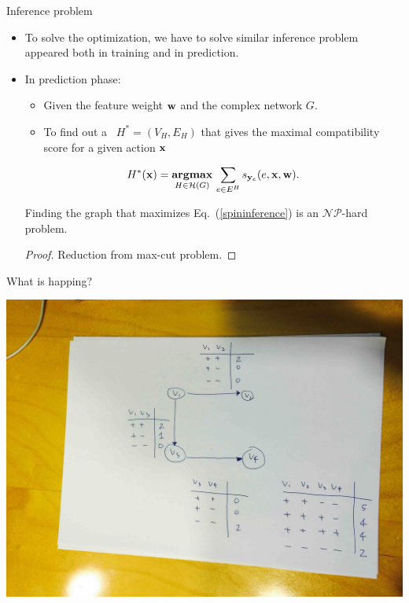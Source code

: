 \documentclass[first=dgreen,second=purple,logo=red]{aaltoslides}
\begin{document}
\begin{frame}{Inference problem}
	\begin{itemize}
		\item To solve the optimization, we have to solve similar inference problem appeared both in training and in prediction.
		\item In prediction phase:
		\begin{itemize}\footnotesize
			\item Given the feature weight $\mathbf {w}$ and the complex network $G$.
			\item To find out a \daggraph\ $H^*=(V_H,E_H)$ that gives the maximal compatibility score for a given action $\mathbf {x}$
		\end{itemize}
	\begin{align}
		H^*(\mathbf {x}) = \underset{H\in \mathcal{H}(G)}{\textbf{argmax}}\, \sum_{e\in E^H}s_{\mathbf {y}_e}(e,\mathbf {x},\mathbf {w}).\label{spininference}
	\end{align}
	\begin{lemma}\footnotesize
		Finding the graph that maximizes Eq.~(\ref{spininference}) is an $\mathcal{NP}$-hard problem.
	\end{lemma}
	\begin{proof}\footnotesize
		Reduction from {\sc max-cut} problem.
	\end{proof}
	\end{itemize}
\end{frame}

%
\begin{frame}{What is happing?}
	\begin{center}
		\includegraphics[scale=0.07]{./figures/networkresponseexample.jpg}
	\end{center}
\end{frame}
\end{document}
